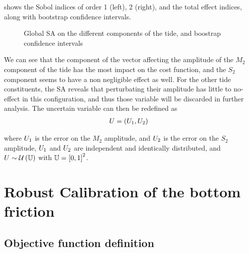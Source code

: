 \documentclass[../../Main_ManuscritThese.tex]{subfiles}
\newcommand\imgpath{/home/victor/acadwriting/Manuscrit/Text/Chapter5/img/}
\begin{document}
 shows the Sobol indices of order 1 (left), 2
(right), and the total effect indices, along with bootstrap confidence
intervals.
\begin{figure}[ht]
  \centering
  
  \caption{\label{fig:SA_tides} Global SA on the different components
    of the tide, and boostrap confidence intervals}
\end{figure}

We can see that the component of the vector affecting the amplitude of
the $M_2$ component of the tide has the most impact on the cost
function, and the $S_2$ component seems to have a non negligible
effect as well. For the other tide constituents, the SA reveals that
perturbating their amplitude has little to no-effect in this
configuration, and thus those variable will be discarded in further
analysis. The uncertain variable can then be redefined as
\begin{align}
  \UU = (\UU_1, \UU_2)%
\end{align}

where $U_1$ is the error on the $M_2$ amplitude, and $U_2$ is the
error on the $S_2$ amplitude, $U_1$ and $U_2$ are independent and
identically distributed, and
$U \sim \mathcal{U}\left(\mathbb{U}\right)$ with
$\Uspace = \interval{0}{1}^2$.

\clearpage
\section{Robust Calibration of the bottom friction}

\subsection{Objective function definition}
\end{document}
